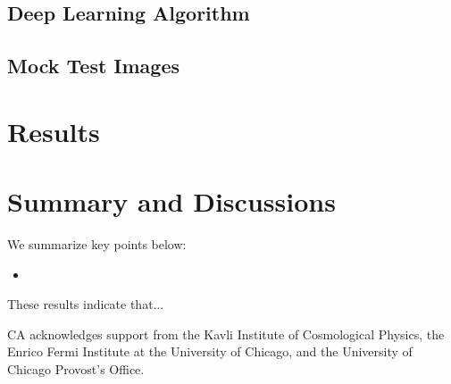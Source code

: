 \documentclass{emulateapj}
\begin{document}
\subsection{Deep Learning Algorithm}

\subsection{Mock Test Images}


\section{Results}
\label{sec:results}


\section{Summary and Discussions}
\label{sec:conclusions}

We summarize key points below:

\begin{itemize}

\item 
    
\end{itemize}

These results indicate that...

\acknowledgments CA acknowledges support from the Kavli Institute of
Cosmological Physics, the Enrico Fermi Institute at the University of
Chicago, and the University of Chicago Provost's Office.
\lastpagefootnotes



\end{document}

